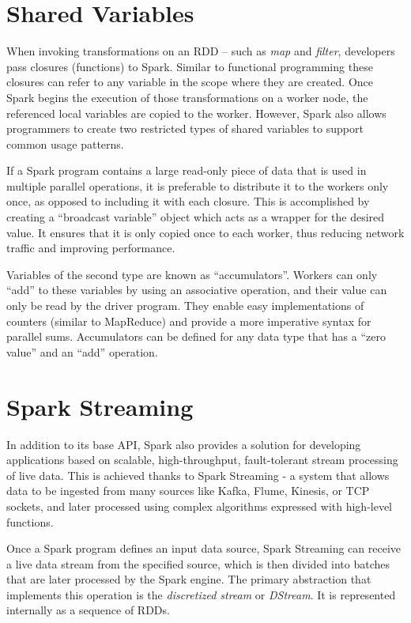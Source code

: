 \documentclass{l4proj}
\begin{document}
\section{Shared Variables}

When invoking transformations on an RDD -- such as \textit{map} and \textit{filter}, developers pass closures (functions) to Spark. Similar to functional programming these closures can refer to any variable in the scope where they are created. Once Spark begins the execution of those transformations on a worker node, the referenced local variables are copied to the worker. However, Spark also allows programmers to create two restricted types of shared variables to support common usage patterns\cite{Spark}.

If a Spark program contains a large read-only piece of data that is used in multiple parallel operations, it is preferable to distribute it to the workers only once, as opposed to including it with each closure. This is accomplished by creating a ``broadcast variable'' object which acts as a wrapper for the desired value. It ensures that it is only copied once to each worker, thus reducing network traffic and improving performance.

Variables of the second type are known as ``accumulators''. Workers can only ``add'' to these variables by using an associative operation, and their value can only be read by the driver program. They enable easy implementations of counters (similar to MapReduce) and provide a more imperative syntax for parallel sums. Accumulators can be defined for any data type that has a ``zero value'' and an ``add'' operation.

\section{Spark Streaming}

In addition to its base API, Spark also provides a solution for developing applications based on scalable, high-throughput, fault-tolerant stream processing of live data. This is achieved thanks to Spark Streaming - a system that allows data to be ingested from many sources like Kafka, Flume, Kinesis, or TCP sockets, and later processed using complex algorithms expressed with high-level functions.

Once a Spark program defines an input data source, Spark Streaming can receive a live data stream from the specified source, which is then divided into batches that are later processed by the Spark engine. The primary abstraction that implements this operation is the \textit{discretized stream} or \textit{DStream}\cite{DStream}. It is represented internally as a sequence of RDDs.
\end{document}
